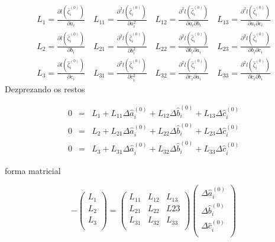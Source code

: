 	\begin{eqnarray}
		L_1 = \displaystyle\frac{\partial l(\hat{\zeta}_i^{(0)})}{\partial a_i} \quad L_{11} =  \displaystyle\frac{\partial^2 l(\hat{\zeta}_i^{(0)})}{\partial a_i^2} \quad L_{12}  = \displaystyle\frac{\partial^2 l(\hat{\zeta}_i^{(0)})}{\partial a_i \partial b_i} \quad L_{13} = \displaystyle\frac{\partial^2 l(\hat{\zeta}_i^{(0)})}{\partial a_i \partial c_i} \nonumber\\
		L_2 = \displaystyle\frac{\partial l(\hat{\zeta}_i^{(0)})}{\partial b_i} \quad L_{21} = \displaystyle\frac{\partial^2 l(\hat{\zeta}_i^{(0)})}{\partial b_i^2} \quad L_{22} = \displaystyle\frac{\partial^2 l(\hat{\zeta}_i^{(0)})}{\partial b_i \partial a_i} \quad L_{23} =  \displaystyle\frac{\partial^2 l(\hat{\zeta}_i^{(0)})}{\partial b_i \partial c_i}\nonumber\\
		L_3 = \displaystyle\frac{\partial l(\hat{\zeta}_i^{(0)})}{\partial c_i} \quad L_{31} = \displaystyle\frac{\partial^2 l(\hat{\zeta}_i^{(0)})}{\partial c_i^2} \quad L_{32} = \displaystyle\frac{\partial^2 l(\hat{\zeta}_i^{(0)})}{\partial c_i \partial a_i } \quad L_{33} = \displaystyle\frac{\partial^2 l(\hat{\zeta}_i^{(0)})}{\partial c_i \partial b_i} \nonumber
	\end{eqnarray}
	Dezprezando os restos
	
	\begin{eqnarray}
		0 &=& L_1 + L_{11}\Delta\hat{a}_i^{(0)} + L_{12}\Delta\hat{b}_i^{(0)} + L_{13}\Delta\hat{c}_i^{(0)}\\
		0 &=& L_2 + L_{21}\Delta\hat{a}_i^{(0)} + L_{22}\Delta\hat{b}_i^{(0)} + L_{23}\Delta\hat{c}_i^{(0)}\\
		0 &=& L_3 + L_{31}\Delta\hat{a}_i^{(0)} + L_{32}\Delta\hat{b}_i^{(0)} + L_{33}\Delta\hat{c}_i^{(0)}
	\end{eqnarray}
	
	forma matricial
	
	$$
	-\left(\begin{array}{c}
	L_1\\
	L_2\\
	L_3\\
	\end{array}\right) =  
	\left(\begin{array}{ccc}
	L_{11} & L_{12} & L_{13}\\
	L_{21} & L_{22} & L{23}\\
	L_{31} & L_{32} & L_{33}\\
	\end{array}\right)
	\left(\begin{array}{c}
	\Delta\hat{a}_i^{(0)}\\
	\Delta\hat{b}_i^{(0)}\\
	\Delta\hat{c}_i^{(0)}\\
	\end{array}\right)
	$$
	
